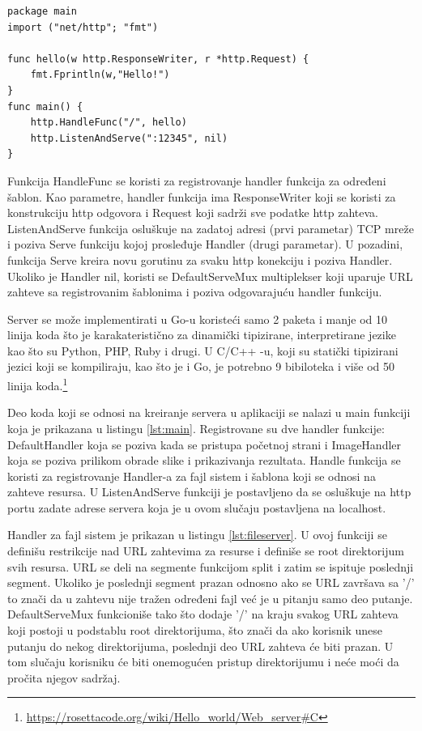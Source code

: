 \documentclass[12pt,oneside]{memoir}
\begin{document}
\begin{center}
\begin{lstlisting}[caption=Primer jednostavnog servera,label={lst:server1},   backgroundcolor=\color{background}]
package main
import ("net/http"; "fmt")

func hello(w http.ResponseWriter, r *http.Request) {
	fmt.Fprintln(w,"Hello!")
}
func main() {
	http.HandleFunc("/", hello)
	http.ListenAndServe(":12345", nil)
}
\end{lstlisting}
\end{center}


Funkcija HandleFunc se koristi za registrovanje handler funkcija za određeni šablon. Kao parametre, handler funkcija ima ResponseWriter koji se koristi za konstrukciju http odgovora i  Request koji sadrži sve podatke http zahteva. ListenAndServe funkcija osluškuje na zadatoj adresi (prvi parametar) TCP mreže i poziva Serve funkciju kojoj prosleđuje Handler (drugi parametar). U pozadini, funkcija Serve kreira novu gorutinu za svaku http konekciju i poziva Handler. Ukoliko je Handler nil, koristi se DefaultServeMux multiplekser koji uparuje URL zahteve sa registrovanim šablonima i poziva odgovarajuću handler funkciju. 

Server se može implementirati u Go-u  koristeći samo 2 paketa i manje od 10 linija koda što je karakateristično za dinamički tipizirane, interpretirane jezike kao što su Python, PHP, Ruby i drugi. U C/C++ -u, koji su statički tipizirani jezici koji se kompiliraju, kao što je i Go, je potrebno 9 bibiloteka i više od 50 linija koda.\footnote{\url{https://rosettacode.org/wiki/Hello_world/Web_server\#C}}

Deo koda koji se odnosi na kreiranje servera u aplikaciji se nalazi u main funkciji koja je prikazana u listingu \ref{lst:main}. Registrovane su dve handler funkcije: DefaultHandler koja se poziva kada se pristupa početnoj strani i ImageHandler koja se poziva prilikom obrade slike i prikazivanja rezultata. Handle funkcija se koristi za registrovanje Handler-a za fajl sistem i šablona koji se odnosi na zahteve resursa.  U ListenAndServe funkciji je postavljeno da se osluškuje na http portu zadate adrese servera koja je u ovom slučaju postavljena na localhost.

\label{fileserver}Handler za fajl sistem je prikazan u listingu \ref{lst:fileserver}. U ovoj funkciji se definišu restrikcije nad URL zahtevima za resurse i definiše se root direktorijum svih resursa. URL se deli na segmente funkcijom split i zatim se ispituje poslednji segment. Ukoliko je poslednji segment prazan odnosno ako se URL završava sa '/' to znači da u zahtevu nije tražen određeni fajl već je u pitanju samo deo putanje. DefaultServeMux funkcioniše tako što dodaje '/' na kraju svakog URL zahteva koji postoji u podstablu root direktorijuma, što znači da ako korisnik unese putanju do nekog direktorijuma, poslednji deo URL zahteva će biti prazan. U tom slučaju korisniku će biti onemogućen pristup direktorijumu i neće moći da pročita njegov sadržaj.
\end{document}
